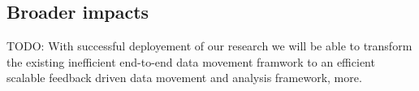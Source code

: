 \documentclass[11pt]{article}
\begin{document}






\subsection{Broader impacts}
TODO: With successful deployement of our research we will be able to transform the existing inefficient end-to-end data movement framwork to an efficient scalable feedback driven data movement and analysis framework, more.



\end{document}
